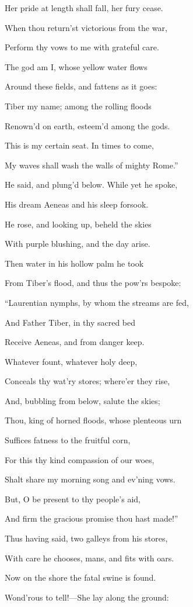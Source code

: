 Her pride at length shall fall, her fury cease.

When thou return’st victorious from the war,

Perform thy vows to me with grateful care.

The god am I, whose yellow water flows

Around these fields, and fattens as it goes:

Tiber my name; among the rolling floods

Renown’d on earth, esteem’d among the gods.

This is my certain seat. In times to come,

My waves shall wash the walls of mighty Rome.”

He said, and plung’d below. While yet he spoke,

His dream Aeneas and his sleep forsook.

He rose, and looking up, beheld the skies

With purple blushing, and the day arise.

Then water in his hollow palm he took

From Tiber’s flood, and thus the pow’rs bespoke:

“Laurentian nymphs, by whom the streams are fed,

And Father Tiber, in thy sacred bed

Receive Aeneas, and from danger keep.

Whatever fount, whatever holy deep,

Conceals thy wat’ry stores; where’er they rise,

And, bubbling from below, salute the skies;

Thou, king of horned floods, whose plenteous urn

Suffices fatness to the fruitful corn,

For this thy kind compassion of our woes,

Shalt share my morning song and ev’ning vows.

But, O be present to thy people’s aid,

And firm the gracious promise thou hast made!”

Thus having said, two galleys from his stores,

With care he chooses, mans, and fits with oars.

Now on the shore the fatal swine is found.

Wond’rous to tell!—She lay along the ground:

